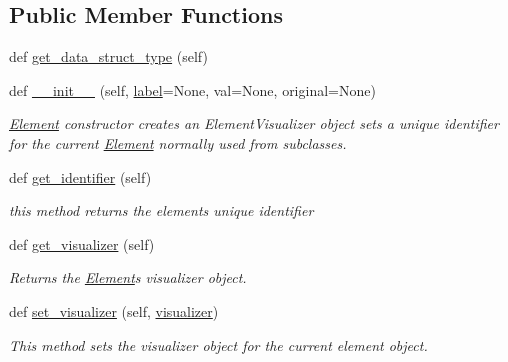 \subsection*{Public Member Functions}
\begin{DoxyCompactItemize}
\item 
def \mbox{\hyperlink{class_bridges_1_1element_1_1_element_aeb25959809a6c89fa7a1fcb55378e751}{get\+\_\+data\+\_\+struct\+\_\+type}} (self)
\item 
def \mbox{\hyperlink{class_bridges_1_1element_1_1_element_a614a24a46784b7269c7d05e0472c4153}{\+\_\+\+\_\+init\+\_\+\+\_\+}} (self, \mbox{\hyperlink{class_bridges_1_1element_1_1_element_a0aedaa53836e4af0c2d81a0a5b16115a}{label}}=None, val=None, original=None)
\begin{DoxyCompactList}\small\item\em \mbox{\hyperlink{class_bridges_1_1element_1_1_element}{Element}} constructor creates an Element\+Visualizer object sets a unique identifier for the current \mbox{\hyperlink{class_bridges_1_1element_1_1_element}{Element}} normally used from subclasses. \end{DoxyCompactList}\item 
def \mbox{\hyperlink{class_bridges_1_1element_1_1_element_a01b3d0e57ce06b996629acdb1cfaafb6}{get\+\_\+identifier}} (self)
\begin{DoxyCompactList}\small\item\em this method returns the element\textquotesingle{}s unique identifier \end{DoxyCompactList}\item 
def \mbox{\hyperlink{class_bridges_1_1element_1_1_element_a0f9c10a5424253aa27f2737e9d1c5411}{get\+\_\+visualizer}} (self)
\begin{DoxyCompactList}\small\item\em Returns the \mbox{\hyperlink{class_bridges_1_1element_1_1_element}{Element}}\textquotesingle{}s visualizer object. \end{DoxyCompactList}\item 
def \mbox{\hyperlink{class_bridges_1_1element_1_1_element_a8147ac170339450e4c375fd66dd2f863}{set\+\_\+visualizer}} (self, \mbox{\hyperlink{class_bridges_1_1element_1_1_element_a929f63e3aaaeff971a1def438168559a}{visualizer}})
\begin{DoxyCompactList}\small\item\em This method sets the visualizer object for the current element object. \end{DoxyCompactList}\item 

\end{DoxyCompactItemize}
